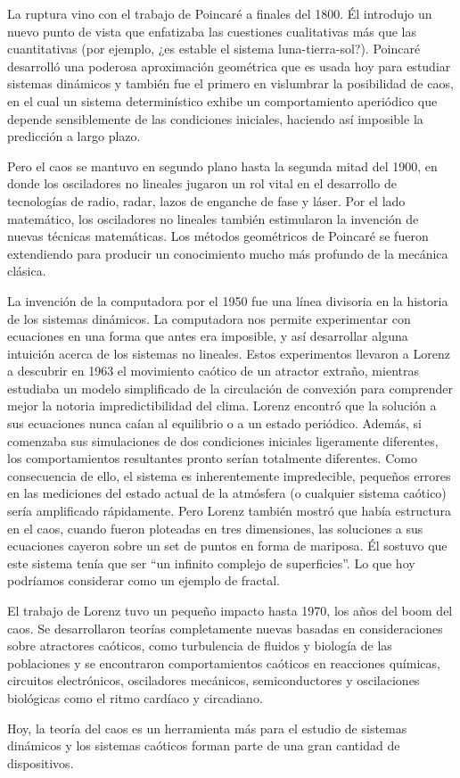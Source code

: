 La ruptura vino con el trabajo de Poincaré a finales del 1800.
Él introdujo un nuevo punto de vista que enfatizaba las cuestiones cualitativas más que las cuantitativas (por ejemplo, ¿es estable el sistema luna-tierra-sol?).
Poincaré desarrolló una poderosa aproximación geométrica que es usada hoy para estudiar sistemas dinámicos y también fue el primero en vislumbrar la posibilidad
de caos, en el cual un sistema determinístico exhibe un comportamiento aperiódico que depende sensiblemente de las condiciones iniciales, haciendo así imposible la predicción a largo plazo.

Pero el caos se mantuvo en segundo plano hasta la segunda mitad del 1900, en donde los osciladores no lineales jugaron un rol vital en el desarrollo de tecnologías de radio, radar, lazos de enganche de fase y láser.
Por el lado matemático, los osciladores no lineales también estimularon la invención de nuevas técnicas matemáticas.
Los métodos geométricos de Poincaré se fueron extendiendo para producir un conocimiento mucho más profundo de la mecánica clásica.

La invención de la computadora por el 1950 fue una línea divisoria en la historia de los sistemas dinámicos.
La computadora nos permite experimentar con ecuaciones en una forma que antes era imposible, y así desarrollar alguna intuición acerca de los sistemas no lineales.
Estos experimentos llevaron a Lorenz a descubrir en 1963 el movimiento caótico de un atractor extraño, mientras estudiaba un modelo simplificado de la circulación de convexión para comprender mejor la notoria impredictibilidad del clima.
Lorenz encontró que la solución a sus ecuaciones nunca caían al equilibrio o a un estado periódico.
Además, si comenzaba sus simulaciones de dos condiciones iniciales ligeramente diferentes, los comportamientos resultantes pronto serían
totalmente diferentes.
Como consecuencia de ello, el sistema es inherentemente impredecible, pequeños errores en las mediciones del estado actual de la atmósfera (o cualquier sistema caótico)
sería amplificado rápidamente.
Pero Lorenz también mostró que había estructura en el caos, cuando fueron ploteadas en tres dimensiones, las soluciones a sus ecuaciones cayeron sobre un
set de puntos en forma de mariposa.
Él sostuvo que este sistema tenía que ser “un infinito complejo de superficies”.
Lo que hoy podríamos considerar como un ejemplo de fractal.

El trabajo de Lorenz tuvo un pequeño impacto hasta 1970, los años del boom del caos.
Se desarrollaron teorías completamente nuevas basadas en consideraciones sobre atractores caóticos, como turbulencia de fluidos y biología de las poblaciones y se encontraron comportamientos caóticos en reacciones químicas, circuitos electrónicos, osciladores mecánicos, semiconductores y oscilaciones biológicas como el ritmo cardíaco y circadiano.

Hoy, la teoría del caos es un herramienta más para el estudio de sistemas dinámicos y los sistemas caóticos forman parte de una gran cantidad de dispositivos.